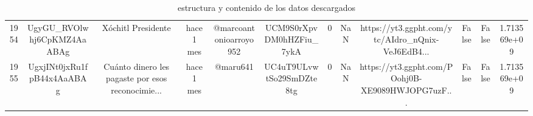 \begin{table}[H]
{\begin{tabular}{cccccccccccc}
			1954                    & UgyGU\_RVOlwhj6CpKMZ4AaABAg & Xóchitl Presidente                                 & hace 1 mes              & @marcoantonioarroyo952  & UCM9S0rXpvDM0hHZFiu\_7ykA & 0                       & NaN                     & https://yt3.ggpht.com/ytc/AIdro\_nQnix-VeJ6EdB4... & False                   & False                   & 1.713569e+09            \\
			1955                    & UgxjINt0jxRu1fpB44x4AaABAg  & Cuánto dinero les pagaste por esos reconocimie...  & hace 1 mes              & @maru641                & UC4uT9ULvwtSo29SmDZte8tg  & 0                       & NaN                     & https://yt3.ggpht.com/POohj0B-XE9089HWJOPG7uzF...  & False                   & False                   & 1.713569e+09           
		\end{tabular}%
	}
	\caption{estructura y contenido de los datos descargados}
	\label{tab:T1}
\end{table}



